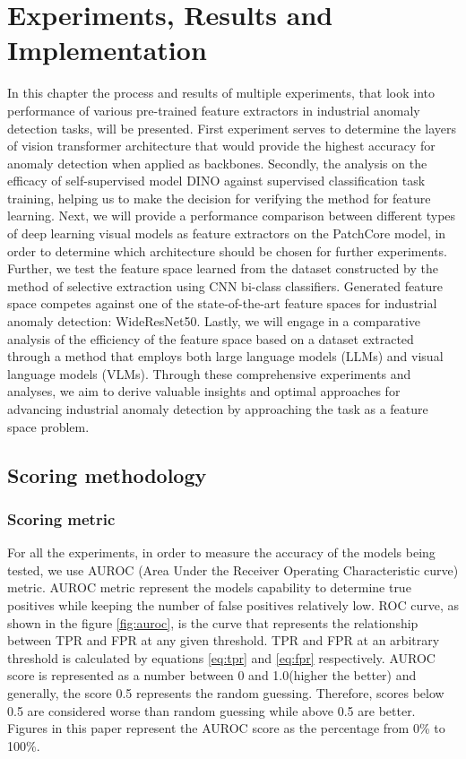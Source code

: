 \chapter{Experiments, Results and Implementation}
\label{chapter:ch4}

In this chapter the process and results of multiple experiments, that look into performance of various pre-trained feature extractors in industrial anomaly detection tasks, will be presented. First experiment serves to determine the layers of vision transformer architecture that would provide the highest accuracy for anomaly detection when applied as backbones. Secondly, the analysis on the efficacy of self-supervised model DINO against supervised classification task training, helping us to make the decision for verifying the method for feature learning. Next, we will provide a performance comparison between different types of deep learning visual models as feature extractors on the PatchCore model, in order to determine which architecture should be chosen for further experiments. Further, we test the feature space learned from the dataset constructed by the method of selective extraction using CNN bi-class classifiers. Generated feature space competes against one of the state-of-the-art feature spaces for industrial anomaly detection: WideResNet50. Lastly, we will engage in a comparative analysis of the efficiency of the feature space based on a dataset extracted through a method that employs both large language models (LLMs) and visual language models (VLMs). Through these comprehensive experiments and analyses, we aim to derive valuable insights and optimal approaches for advancing industrial anomaly detection by approaching the task as a feature space problem.

\section{Scoring methodology}

\subsection{Scoring metric}
For all the experiments, in order to measure the accuracy of the models being tested, we use AUROC (Area Under the Receiver Operating Characteristic curve) metric. AUROC metric represent the models capability to determine true positives while keeping the number of false positives relatively low. ROC curve, as shown in the figure \ref{fig:auroc}, is the curve that represents the relationship between TPR and FPR at any given threshold. TPR and FPR at an arbitrary threshold is calculated by equations \ref{eq:tpr} and \ref{eq:fpr} respectively. AUROC score is represented as a number between 0 and 1.0(higher the better) and generally, the score 0.5 represents the random guessing. Therefore, scores below 0.5 are considered worse than random guessing while above 0.5 are better. Figures in this paper represent the AUROC score as the percentage from 0\% to 100\%.

